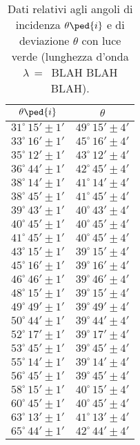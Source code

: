 \begin{table}[H]
    \centering
    \small
    \begin{tabular}{c c}
        \toprule
	$\theta\ped{i}$ & $\theta$ \\
        \midrule
	$31^\circ \, 15' \pm 1'$ &	$49^\circ \, 15' \pm 4'$ \\	%
	$33^\circ \, 16' \pm 1'$ &	$45^\circ \, 16' \pm 4'$ \\	%
	$35^\circ \, 12' \pm 1'$ &	$43^\circ \, 12' \pm 4'$ \\	%
	$36^\circ \, 44' \pm 1'$ &	$42^\circ \, 45' \pm 4'$ \\	%
	$38^\circ \, 14' \pm 1'$ &	$41^\circ \, 14' \pm 4'$ \\	%
	$38^\circ \, 45' \pm 1'$ &	$41^\circ \, 45' \pm 4'$ \\	%
	$39^\circ \, 43' \pm 1'$ &	$40^\circ \, 43' \pm 4'$ \\	%
	$40^\circ \, 45' \pm 1'$ &	$40^\circ \, 45' \pm 4'$ \\	%
	$41^\circ \, 45' \pm 1'$ &	$40^\circ \, 45' \pm 4'$ \\	%
	$43^\circ \, 15' \pm 1'$ &	$39^\circ \, 15' \pm 4'$ \\	%
	$45^\circ \, 16' \pm 1'$ &	$39^\circ \, 16' \pm 4'$ \\	%
	$46^\circ \, 46' \pm 1'$ &	$39^\circ \, 46' \pm 4'$ \\	%
	$48^\circ \, 15' \pm 1'$ &	$39^\circ \, 15' \pm 4'$ \\	%
	$49^\circ \, 49' \pm 1'$ &	$39^\circ \, 49' \pm 4'$ \\	%
	$50^\circ \, 44' \pm 1'$ &	$39^\circ \, 44' \pm 4'$ \\	%
	$52^\circ \, 17' \pm 1'$ &	$39^\circ \, 17' \pm 4'$ \\	%
	$53^\circ \, 45' \pm 1'$ &	$39^\circ \, 45' \pm 4'$ \\	%
	$55^\circ \, 14' \pm 1'$ &	$39^\circ \, 14' \pm 4'$ \\	%
	$56^\circ \, 45' \pm 1'$ &	$39^\circ \, 45' \pm 4'$ \\	%
	$58^\circ \, 15' \pm 1'$ &	$40^\circ \, 15' \pm 4'$ \\	%
	$60^\circ \, 45' \pm 1'$ &	$40^\circ \, 45' \pm 4'$ \\	%
	$63^\circ \, 13' \pm 1'$ &	$41^\circ \, 13' \pm 4'$ \\	%
	$65^\circ \, 44' \pm 1'$ &	$42^\circ \, 44' \pm 4'$ \\	%
        \bottomrule
    \end{tabular}
    \caption{Dati relativi agli angoli di incidenza $\theta\ped{i}$ e di deviazione $\theta$ con luce verde (lunghezza d'onda$\lambda\,=\,$ BLAH BLAH BLAH).}
    \label{tab:dev}
\end{table}
